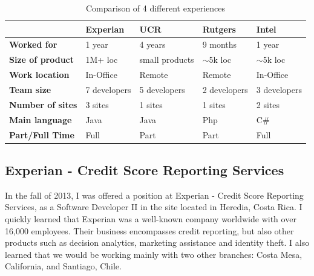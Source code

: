 \documentclass[12pt, letterpaper]{article}
\begin{document}
\begin{table}[] 
\centering
\caption{Comparison of 4 different experiences}
\label{comparisonTable}
\begin{tabular}{lllll}
\hline
                         & \textbf{Experian}      & \textbf{UCR}   & \textbf{Rutgers} & \textbf{Intel} \\ \hline
                         
\textbf{Worked for}      & 1 year                 & 4 years        & 9 months         & 1 year         \\ 
\textbf{Size of product} & 1M+ loc                & small products & $\sim$5k loc     & $\sim$5k loc   \\ 
\textbf{Work location}   & In-Office              & Remote         & Remote           & In-Office      \\ 
\textbf{Team size}       & 7 developers           & 5 developers   & 2 developers     & 3 developers   \\ 
\textbf{Number of sites} & 3 sites                & 1 sites        & 1 sites          & 2 sites        \\ 
\textbf{Main language}   & Java                   & Java           & Php              & C\#            \\ 
\textbf{Part/Full Time}  & Full                   & Part           & Part             & Full           \\ \hline
\end{tabular}
\end{table}

\subsection{Experian - Credit Score Reporting Services}
In the fall of 2013, I was offered a position at Experian - Credit Score Reporting Services, as a Software Developer II in the site located in Heredia, Costa Rica.
I quickly learned that Experian was a well-known company worldwide with over 16,000
employees. Their business encompasses credit reporting, but also other products such as decision 
analytics, marketing assistance and identity theft. I also learned that we would be working mainly with two other branches: 
Costa Mesa, California, and Santiago, Chile. 
\end{document}
